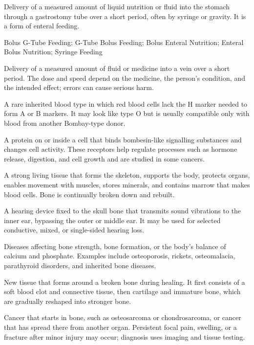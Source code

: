  Delivery of a measured amount of liquid nutrition or fluid into the stomach through a gastrostomy tube over a short period, often by syringe or gravity. It is a form of enteral feeding.

\synonyms
Bolus G-Tube Feeding; G-Tube Bolus Feeding; Bolus Enteral Nutrition; Enteral Bolus Nutrition; Syringe Feeding

 Delivery of a measured amount of fluid or medicine into a vein over a short period. The dose and speed depend on the medicine, the person's condition, and the intended effect; errors can cause serious harm.

 A rare inherited blood type in which red blood cells lack the H marker needed to form A or B markers. It may look like type O but is usually compatible only with blood from another Bombay-type donor.

 A protein on or inside a cell that binds bombesin-like signalling substances and changes cell activity. These receptors help regulate processes such as hormone release, digestion, and cell growth and are studied in some cancers.

 A strong living tissue that forms the skeleton, supports the body, protects organs, enables movement with muscles, stores minerals, and contains marrow that makes blood cells. Bone is continually broken down and rebuilt.

 A hearing device fixed to the skull bone that transmits sound vibrations to the inner ear, bypassing the outer or middle ear. It may be used for selected conductive, mixed, or single-sided hearing loss.

 Diseases affecting bone strength, bone formation, or the body's balance of calcium and phosphate. Examples include osteoporosis, rickets, osteomalacia, parathyroid disorders, and inherited bone diseases.

 New tissue that forms around a broken bone during healing. It first consists of a soft blood clot and connective tissue, then cartilage and immature bone, which are gradually reshaped into stronger bone.

 Cancer that starts in bone, such as osteosarcoma or chondrosarcoma, or cancer that has spread there from another organ. Persistent focal pain, swelling, or a fracture after minor injury may occur; diagnosis uses imaging and tissue testing.

